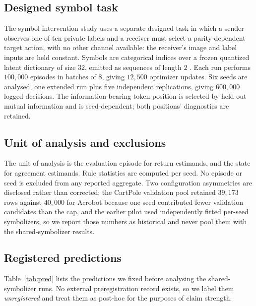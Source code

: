 \documentclass[11pt,a4paper]{article}
\begin{document}
\subsection{Designed symbol task}

The symbol-intervention study uses a separate designed task in which a sender observes one of ten private labels and a receiver must select a parity-dependent target action, with no other channel available: the receiver's image and label inputs are held constant. Symbols are categorical indices over a frozen quantized latent dictionary of size $32$, emitted as sequences of length $2$ \citep{vandenoord2017,liu2025aim}. Each run performs $100{,}000$ episodes in batches of $8$, giving $12{,}500$ optimizer updates. Six seeds are analysed, one extended run plus five independent replications, giving $600{,}000$ logged decisions. The information-bearing token position is selected by held-out mutual information and is seed-dependent; both positions' diagnostics are retained.

\subsection{Unit of analysis and exclusions}

The unit of analysis is the evaluation episode for return estimands, and the state for agreement estimands. Rule statistics are computed per seed. No episode or seed is excluded from any reported aggregate. Two configuration asymmetries are disclosed rather than corrected: the CartPole validation pool retained $39{,}173$ rows against $40{,}000$ for Acrobot because one seed contributed fewer validation candidates than the cap, and the earlier pilot used independently fitted per-seed symbolizers, so we report those numbers as historical and never pool them with the shared-symbolizer results.

\subsection{Registered predictions}
\label{sec:setup-pred}

Table~\ref{tab:pred} lists the predictions we fixed before analysing the shared-symbolizer runs. No external preregistration record exists, so we label them \emph{unregistered} and treat them as post-hoc for the purposes of claim strength.
\end{document}
